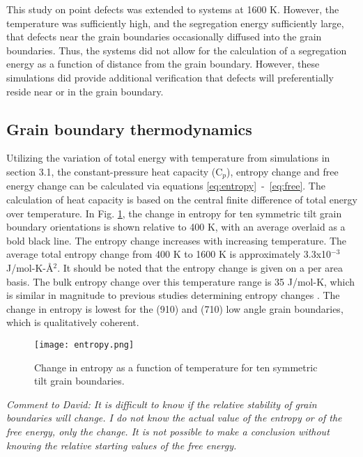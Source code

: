 \documentclass[review]{elsarticle}
\begin{document}
This study on point defects was extended to systems at 1600 K. However, the temperature was sufficiently high, and the segregation energy sufficiently large, that defects near the grain boundaries occasionally diffused into the grain boundaries. Thus, the systems did not allow for the calculation of a segregation energy as a function of distance from the grain boundary. However, these simulations did provide additional verification that defects will preferentially reside near or in the grain boundary. 

\FloatBarrier

\subsection{Grain boundary thermodynamics}

Utilizing the variation of total energy with temperature from simulations in section 3.1, the constant-pressure heat capacity (C$_{p}$), entropy change and free energy change can be calculated via equations \ref{eq:entropy}~-~\ref{eq:free}. The calculation of heat capacity is based on the central finite difference of total energy over temperature. In Fig. \ref{fig:entropy}, the change in entropy for ten symmetric tilt grain boundary orientations is shown relative to 400 K, with an average overlaid as a bold black line. The entropy change increases with increasing temperature. The average total entropy change from 400 K to 1600 K is approximately 3.3x10$^{-3}$ J/mol-K-{\AA}$^{2}$. It should be noted that the entropy change is given on a per area basis. The bulk entropy change over this temperature range is 35 J/mol-K, which is similar in magnitude to previous studies determining entropy changes \cite{mcnutt2014, peter2004}. The change in entropy is lowest for the (910) and (710) low angle grain boundaries, which is qualitatively coherent.

\begin{figure}[h]
 \centering
 \texttt{[image: entropy.png]} 
 \caption{Change in entropy as a function of temperature for ten symmetric tilt grain boundaries.}
 \label{fig:entropy}
\end{figure}

\textit{\color{blue}Comment to David: It is difficult to know if the relative stability of grain boundaries will change. I do not know the actual value of the entropy or of the free energy, only the change. It is not possible to make a conclusion without knowing the relative starting values of the free energy. } 
\end{document}

